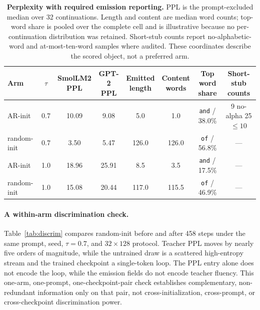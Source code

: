 \documentclass{article}
\newcommand{\armA}{AR-init}
\newcommand{\armB}{random-init}
\begin{document}
\begin{table}[!t]
  \caption{\textbf{Perplexity with required emission reporting.} PPL is
  the prompt-excluded median over 32 continuations.  Length and content are
  median word counts; top-word share is pooled over the complete cell and is
  illustrative because no per-continuation distribution was retained.
  Short-stub counts report no-alphabetic-word and at-most-ten-word samples where
  audited.  These coordinates describe the scored object, not a preferred arm.}
  \label{tab:trap}
  \centering
  \footnotesize
  \setlength{\tabcolsep}{3.5pt}
  \begin{tabular}{@{}lccccccc@{}}
    \toprule
    Arm & $\tau$ & \shortstack{SmolLM2\\PPL} & \shortstack{GPT-2\\PPL} &
      \shortstack{Emitted\\length} & \shortstack{Content\\words} &
      \shortstack{Top word\\share} & \shortstack{Short-stub\\counts} \\
    \midrule
    \armA{} & 0.7 & 10.09 & 9.08 & 5.0 & 1.0 & \texttt{and} / 38.0\% &
      \shortstack{9 no-alpha\\25 $\leq10$} \\
    \armB{} & 0.7 & 3.50 & 5.47 & 126.0 & 126.0 & \texttt{of} / 56.8\% & --- \\
    \armA{} & 1.0 & 18.96 & 25.91 & 8.5 & 3.5 & \texttt{and} / 17.5\% & --- \\
    \armB{} & 1.0 & 15.08 & 20.44 & 117.0 & 115.5 & \texttt{of} / 46.9\% & --- \\
    \bottomrule
  \end{tabular}
\end{table}

\paragraph{A within-arm discrimination check.}
\label{par:discrim}
Table~\ref{tab:discrim} compares \armB{} before and after 458 steps under the
same prompt, seed, $\tau=0.7$, and $32\times128$ protocol.  Teacher PPL moves
by nearly five orders of magnitude, while the untrained draw is a scattered
high-entropy stream and the trained checkpoint a single-token loop.  The PPL
entry alone does not encode the loop, while the emission fields do not encode
teacher fluency.  This
one-arm, one-prompt, one-checkpoint-pair check establishes complementary,
non-redundant information only on that pair, not cross-initialization,
cross-prompt, or cross-checkpoint discrimination power.
\end{document}
